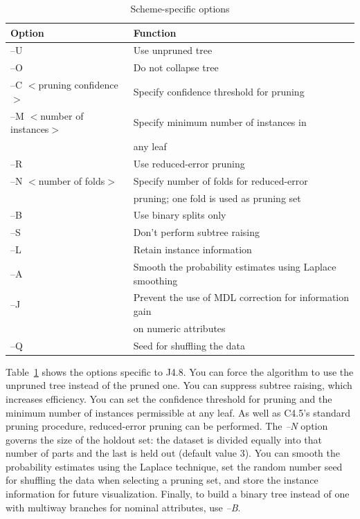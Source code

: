 \begin{table}[!thp]
\footnotesize
{\centering \begin{tabular}{ll}
\hline
Option & Function \\
\hline
--U & Use unpruned tree \\
--O & Do not collapse tree \\
--C $<$pruning confidence$>$ & Specify confidence threshold for pruning \\
--M $<$number of instances$>$ & Specify minimum number of instances in \\
& any leaf \\
--R & Use reduced-error pruning \\
--N $<$number of folds$>$ & Specify number of folds for reduced-error \\
& pruning; one fold is used as pruning set \\
--B & Use binary splits only \\
--S & Don't perform subtree raising \\
--L & Retain instance information \\
--A & Smooth the probability estimates using Laplace smoothing \\
--J & Prevent the use of MDL correction for information gain \\
& on numeric attributes \\
--Q & Seed for shuffling the data \\
\hline
\end{tabular} \footnotesize \par}
\caption{\label{table:j48_command_line_opts}Scheme-specific options}
\end{table}

Table~\ref{table:j48_command_line_opts} shows the options specific to
J4.8. You can force the algorithm to use the unpruned tree instead of
the pruned one. You can suppress subtree raising, which increases
efficiency. You can set the confidence threshold for pruning and the
minimum number of instances permissible at any leaf. As well as C4.5's
standard pruning procedure, reduced-error pruning can be
performed. The \textit{--N} option governs the size of the holdout
set: the dataset is divided equally into that number of parts and the
last is held out (default value 3). You can smooth the probability
estimates using the Laplace technique, set the random number seed for
shuffling the data when selecting a pruning set, and store the
instance information for future visualization. Finally, to build a
binary tree instead of one with multiway branches for nominal
attributes, use \textit{--B}.
